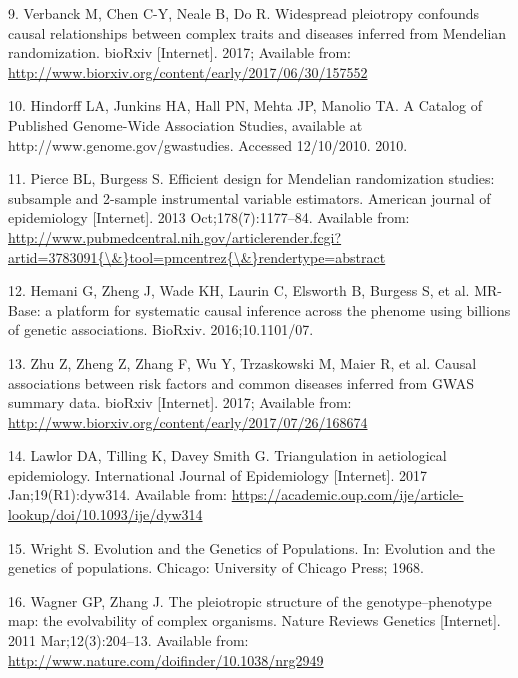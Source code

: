 \documentclass[]{article}
\begin{document}
\hypertarget{ref-Verbanck2017}{}
9. Verbanck M, Chen C-Y, Neale B, Do R. Widespread pleiotropy confounds
causal relationships between complex traits and diseases inferred from
Mendelian randomization. bioRxiv {[}Internet{]}. 2017; Available from:
\url{http://www.biorxiv.org/content/early/2017/06/30/157552}

\hypertarget{ref-Hindorff2010}{}
10. Hindorff LA, Junkins HA, Hall PN, Mehta JP, Manolio TA. A Catalog of
Published Genome-Wide Association Studies, available at
http://www.genome.gov/gwastudies. Accessed 12/10/2010. 2010.

\hypertarget{ref-Pierce2013}{}
11. Pierce BL, Burgess S. Efficient design for Mendelian randomization
studies: subsample and 2-sample instrumental variable estimators.
American journal of epidemiology {[}Internet{]}. 2013
Oct;178(7):1177--84. Available from:
\href{http://www.pubmedcentral.nih.gov/articlerender.fcgi?artid=3783091\%7B/\&\%7Dtool=pmcentrez\%7B/\&\%7Drendertype=abstract}{http://www.pubmedcentral.nih.gov/articlerender.fcgi?artid=3783091\{\textbackslash{}\&\}tool=pmcentrez\{\textbackslash{}\&\}rendertype=abstract}

\hypertarget{ref-Hemani2016}{}
12. Hemani G, Zheng J, Wade KH, Laurin C, Elsworth B, Burgess S, et al.
MR-Base: a platform for systematic causal inference across the phenome
using billions of genetic associations. BioRxiv. 2016;10.1101/07.

\hypertarget{ref-Zhu2017}{}
13. Zhu Z, Zheng Z, Zhang F, Wu Y, Trzaskowski M, Maier R, et al. Causal
associations between risk factors and common diseases inferred from GWAS
summary data. bioRxiv {[}Internet{]}. 2017; Available from:
\url{http://www.biorxiv.org/content/early/2017/07/26/168674}

\hypertarget{ref-Lawlor2017}{}
14. Lawlor DA, Tilling K, Davey Smith G. Triangulation in aetiological
epidemiology. International Journal of Epidemiology {[}Internet{]}. 2017
Jan;19(R1):dyw314. Available from:
\url{https://academic.oup.com/ije/article-lookup/doi/10.1093/ije/dyw314}

\hypertarget{ref-Wright1968}{}
15. Wright S. Evolution and the Genetics of Populations. In: Evolution
and the genetics of populations. Chicago: University of Chicago Press;
1968.

\hypertarget{ref-Wagner2011}{}
16. Wagner GP, Zhang J. The pleiotropic structure of the
genotype--phenotype map: the evolvability of complex organisms. Nature
Reviews Genetics {[}Internet{]}. 2011 Mar;12(3):204--13. Available from:
\url{http://www.nature.com/doifinder/10.1038/nrg2949}
\end{document}
